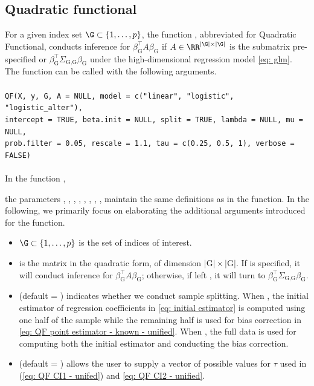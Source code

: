 \subsection{Quadratic functional}
\label{subsec: QF}
For a given index set $\G \subset \{1, \ldots, p\}$, the function , abbreviated for Quadratic Functional, conducts inference for $\beta_{\textrm{G}}^{\intercal}A\beta_{\textrm{G}}$ if $A \in \RR^{|\G|\times|\G|}$ is the submatrix pre-specified or $\beta_{\textrm{G}}^\intercal \Sigma_{\textrm{G,G}} \beta_{\textrm{G}}$ under the high-dimensional regression model \eqref{eq: glm}. The function  can be called with the following arguments.\\
\\
\texttt{QF(X, y, G, A = NULL, model = c("linear", "logistic", "logistic\_alter"), \\ 
\indent intercept = TRUE, beta.init = NULL, split = TRUE, lambda = NULL, mu = NULL, \\
\indent prob.filter = 0.05, rescale = 1.1, tau = c(0.25, 0.5, 1), verbose = FALSE)}
\\
\\
In the function , {the parameters , , , , , , , ,  maintain the same definitions as in the  function. In the following, we primarily focus on elaborating the additional arguments introduced for the  function.
\begin{itemize}
\item $\G \subset \{1, \ldots, p\}$ is the set of indices of interest.
\item {} is the matrix in the quadratic form, of dimension $|\textrm{G}|\times|\textrm{G}|$. If  is specified, it will conduct inference for $\beta_{\textrm{G}}^\intercal A \beta_{\textrm{G}}$; otherwise, if left , it will turn to $\beta_{\textrm{G}}^\intercal \Sigma_{{\textrm{G,G}}} \beta_{\textrm{G}}$.
\item { (default = ) indicates whether we conduct sample splitting. { When , the initial estimator of regression coefficients in \eqref{eq: initial estimator} is computed using one half of the sample while the remaining half is used for bias correction in \eqref{eq: QF point estimator - known - unified}.} When , the full data is used for computing both the initial estimator and conducting the bias correction.} %
\item {} (default = ) allows the user to supply a vector of possible values for $\tau$ used in (\ref{eq: QF CI1 - unifed}) and \eqref{eq: QF CI2 - unified}. %
\end{itemize}}
 
